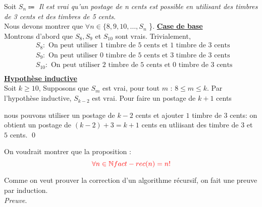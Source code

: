 \documentclass[16pt]{report}
\begin{document}
\begin{multicols*}{2}
            \begin{Preuve}{}{}
                Soit $S_n \Coloneqq$ \textit{Il est vrai qu'un postage de n cents est possible en utilisant 
                des timbres de 3 cents et des timbres de 5 cents}. \\
                Nous devons montrer que $\forall n \in \{8, 9, 10, \dots , S_n$ \}. 
                \underline{\textbf{Case de base}} \vspace{1em}\\ 
                Montrons d'abord que $S_8, S_9$ et $S_{10}$ sont vrais. Trivialement, 
                \begin{align*}
                        &S_8 : \text{ On peut utiliser 1 timbre de 5 cents et 1 timbre de 3 cents} \\ 
                        &S_9 : \text{ On peut utiliser 0 timbre de 5 cents et 3 timbre de 3 cents} \\
                        &S_{10} : \text{ On peut utiliser 2 timbre de 5 cents et 0 timbre de 3 cents} \\
                \end{align*}
                \underline{\textbf{Hypothèse inductive}} \vspace{1em} \\
                Soit $k \geq 10$, Supposons que $S_m$ est vrai, pour tout $m$ : $8 \leq m \leq k$. Par 
                l'hypothèse inductive, $S_{k-2}$ est vrai.  
                Pour faire un postage de $k+1$ cents

                nous pouvons utiliser un postage de 
                $k-2$ cents et ajouter $1$ timbre de $3$ cents: on obtient un postage de 
                $(k-2) + 3 = k+1$ cents en utliisant des timbre de $3$ et $5$ cents. \qed  
            \end{Preuve}

            \begin{Theoremcon}{}
                On voudrait montrer que la proposition :
                \[ \textcolor{red}{\forall n \in \mathbb{N} fact-rec(n) = n!} \]
            \end{Theoremcon}
            \begin{Preuve}{}{}
                Comme on veut prouver la correction d'un algorithme récursif, on 
                fait une preuve par induction. \\ 
                \textit{Preuve}. \\ \vspace{1em}  


\end{Preuve}
\end{multicols*}
\end{document}
